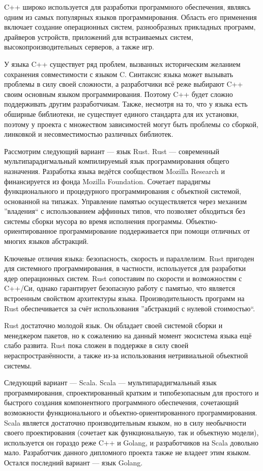 C++ широко используется для разработки программного обеспечения, являясь одним из самых популярных языков программирования. Область его применения включает создание операционных систем, разнообразных прикладных программ, драйверов устройств, приложений для встраиваемых систем, высокопроизводительных серверов, а также игр.

У языка C++ существует ряд проблем, вызванных историческим желанием сохранения совместимости с языком C. Синтаксис языка может вызывать проблемы в силу своей сложности, а разработчики всё реже выбирают C++ своим основным языком программирования. Поэтому C++ будет сложно поддерживать другим разработчикам. Также, несмотря на то, что у языка есть обширные библиотеки, не существует единого стандарта для их установки, поэтому у проекта с множеством зависимостей могут быть проблемы со сборкой, линковкой и несовместимостью различных библиотек.

Рассмотрим следующий вариант — язык Rust. Rust — современный мультипарадигмальный компилируемый язык программирования общего назначения. Разработка языка ведётся сообществом Mozilla Research и финансируется из фонда Mozilla Foundation. Сочетает парадигмы функционального и процедурного программирования с объектной системой, основанной на типажах. Управление памятью осуществляется через механизм ''владения`` с использованием аффинных типов, что позволяет обходиться без системы сборки мусора во время исполнения программы. Объектно-ориентированное программирование поддерживается при помощи отличных от многих языков абстракций.

Ключевые отличия языка: безопасность, скорость и параллелизм. Rust пригоден для системного программирования, в частности, используется для разработки ядер операционных систем. Rust сопоставим по скорости и возможностям с C++/Си, однако гарантирует безопасную работу с памятью, что является встроенным свойством архитектуры языка. Производительность программ на Rust обеспечивается за счёт использования ''абстракций с нулевой стоимостью``.

Rust достаточно молодой язык. Он обладает своей системой сборки и менеджером пакетов, но к сожалению на данный момент экосистема языка ещё слабо развита. Rust пока сложен в поддержке в силу своей нераспространённости, а также из-за использования нетривиальной объектной системы.

Следующий вариант — Scala. Scala — мультипарадигмальный язык программирования, спроектированный кратким и типобезопасным для простого и быстрого создания компонентного программного обеспечения, сочетающий возможности функционального и объектно-ориентированного программирования. Scala является достаточно производительным языком, но в силу необычности своего проектирования (сочетает как функциональную, так и объектную модели), используется он гораздо реже C++ и Golang, и разработчиков на Scala довольно мало. Разработчик данного дипломного проекта также не владеет этим языком. Остался последний вариант — язык Golang.

